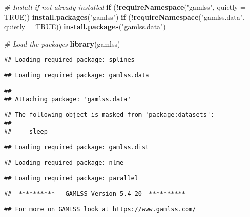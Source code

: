 \documentclass[
]{article}
\newenvironment{Shaded}{\begin{snugshade}}{\end{snugshade}}
\newcommand{\AttributeTok}[1]{\textcolor[rgb]{0.13,0.29,0.53}{#1}}
\newcommand{\CommentTok}[1]{\textcolor[rgb]{0.56,0.35,0.01}{\textit{#1}}}
\newcommand{\ConstantTok}[1]{\textcolor[rgb]{0.56,0.35,0.01}{#1}}
\newcommand{\ControlFlowTok}[1]{\textcolor[rgb]{0.13,0.29,0.53}{\textbf{#1}}}
\newcommand{\FunctionTok}[1]{\textcolor[rgb]{0.13,0.29,0.53}{\textbf{#1}}}
\newcommand{\NormalTok}[1]{#1}
\newcommand{\SpecialCharTok}[1]{\textcolor[rgb]{0.81,0.36,0.00}{\textbf{#1}}}
\newcommand{\StringTok}[1]{\textcolor[rgb]{0.31,0.60,0.02}{#1}}
\begin{document}
\begin{Shaded}
\begin{Highlighting}[]
\CommentTok{\# Install if not already installed}
\ControlFlowTok{if}\NormalTok{ (}\SpecialCharTok{!}\FunctionTok{requireNamespace}\NormalTok{(}\StringTok{"gamlss"}\NormalTok{, }\AttributeTok{quietly =} \ConstantTok{TRUE}\NormalTok{)) }\FunctionTok{install.packages}\NormalTok{(}\StringTok{"gamlss"}\NormalTok{)}
\ControlFlowTok{if}\NormalTok{ (}\SpecialCharTok{!}\FunctionTok{requireNamespace}\NormalTok{(}\StringTok{"gamlss.data"}\NormalTok{, }\AttributeTok{quietly =} \ConstantTok{TRUE}\NormalTok{)) }\FunctionTok{install.packages}\NormalTok{(}\StringTok{"gamlss.data"}\NormalTok{)}

\CommentTok{\# Load the packages}
\FunctionTok{library}\NormalTok{(gamlss)}
\end{Highlighting}
\end{Shaded}

\begin{verbatim}
## Loading required package: splines
\end{verbatim}

\begin{verbatim}
## Loading required package: gamlss.data
\end{verbatim}

\begin{verbatim}
## 
## Attaching package: 'gamlss.data'
\end{verbatim}

\begin{verbatim}
## The following object is masked from 'package:datasets':
## 
##     sleep
\end{verbatim}

\begin{verbatim}
## Loading required package: gamlss.dist
\end{verbatim}

\begin{verbatim}
## Loading required package: nlme
\end{verbatim}

\begin{verbatim}
## Loading required package: parallel
\end{verbatim}

\begin{verbatim}
##  **********   GAMLSS Version 5.4-20  **********
\end{verbatim}

\begin{verbatim}
## For more on GAMLSS look at https://www.gamlss.com/
\end{verbatim}
\end{document}
